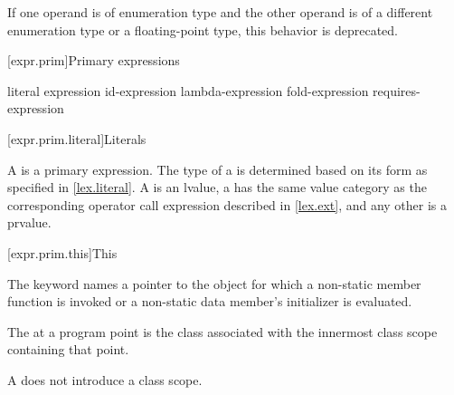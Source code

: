\pnum
If one operand is of enumeration type
and the other operand is of
a different enumeration type or
a floating-point type,
this behavior is deprecated.

[expr.prim]{Primary expressions}%

\begin{bnf}
\br
    literal\br
    \br
    \terminal{(} expression \terminal{)}\br
    id-expression\br
    lambda-expression\br
    fold-expression\br
    requires-expression
\end{bnf}

[expr.prim.literal]{Literals}

\pnum
{}%
%
A  is a primary expression.
The type of a 
is determined based on its form as specified in \ref{lex.literal}.
A  is an lvalue,
a 
has the same value category
as the corresponding operator call expression described in \ref{lex.ext},
and any other  is a prvalue.

[expr.prim.this]{This}

\pnum
{}%
The keyword  names a pointer to the object for which a non-static member
function is invoked or a non-static data member's
initializer is evaluated.

\pnum
The  at a program point is
the class associated with the innermost class scope containing that point.
\begin{note}
A  does not introduce a class scope.
\end{note}

